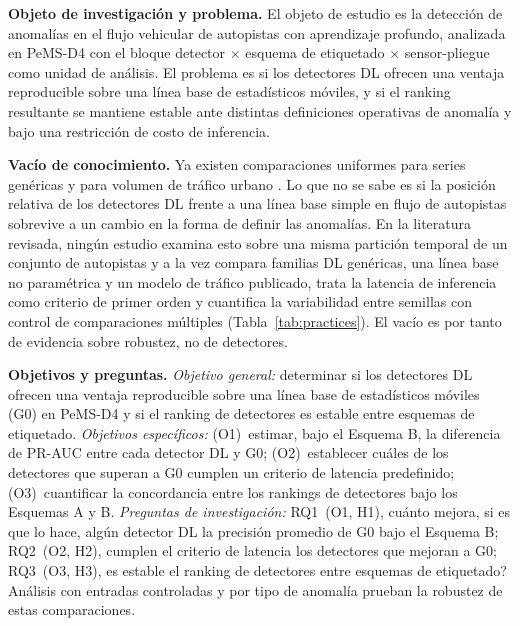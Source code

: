 \documentclass[conference]{IEEEtran}
\begin{document}
\textbf{Objeto de investigaci\'on y problema.} El objeto de estudio es la
detecci\'on de anomal\'ias en el flujo vehicular de autopistas con aprendizaje
profundo, analizada en PeMS-D4 con el bloque detector $\times$ esquema de
etiquetado $\times$ sensor-pliegue como unidad de an\'alisis. El problema es si
los detectores DL ofrecen una ventaja reproducible sobre una l\'inea base de
estad\'isticos m\'oviles, y si el ranking resultante se mantiene estable ante
distintas definiciones operativas de anomal\'ia y bajo una restricci\'on de
costo de inferencia.

\textbf{Vac\'io de conocimiento.} Ya existen comparaciones uniformes para series
gen\'ericas \cite{schmidl2022anomaly,liu2024elephant} y para volumen de tr\'afico
urbano \cite{taheri2026applicability}. Lo que no se sabe es si la posici\'on
relativa de los detectores DL frente a una l\'inea base simple en flujo de
autopistas sobrevive a un cambio en la forma de definir las anomal\'ias. En la
literatura revisada, ning\'un estudio examina esto sobre una misma partici\'on
temporal de un conjunto de autopistas y a la vez compara familias DL
gen\'ericas, una l\'inea base no param\'etrica y un modelo de tr\'afico publicado,
trata la latencia de inferencia como criterio de primer orden y cuantifica la
variabilidad entre semillas con control de comparaciones m\'ultiples
(Tabla~\ref{tab:practices}). El vac\'io es por tanto de evidencia sobre
robustez, no de detectores.

\textbf{Objetivos y preguntas.} \emph{Objetivo general:} determinar si los
detectores DL ofrecen una ventaja reproducible sobre una l\'inea base de
estad\'isticos m\'oviles (G0) en PeMS-D4 y si el ranking de detectores es
estable entre esquemas de etiquetado. \emph{Objetivos espec\'ificos:}
(O1)~estimar, bajo el Esquema B, la diferencia de PR-AUC entre cada detector
DL y G0; (O2)~establecer cu\'ales de los detectores que superan a G0 cumplen un
criterio de latencia predefinido; (O3)~cuantificar la concordancia entre los
rankings de detectores bajo los Esquemas A y B. \emph{Preguntas de
investigaci\'on:} RQ1~(O1, H1), \textquestiondown cu\'anto mejora, si es que lo
hace, alg\'un detector DL la precisi\'on promedio de G0 bajo el Esquema B;
RQ2~(O2, H2), \textquestiondown cumplen el criterio de latencia los detectores
que mejoran a G0; RQ3~(O3, H3), \textquestiondown es estable el ranking de
detectores entre esquemas de etiquetado? An\'alisis con entradas controladas y
por tipo de anomal\'ia prueban la robustez de estas comparaciones.
\end{document}
